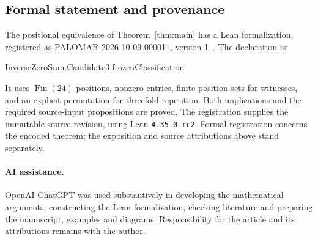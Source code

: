 \documentclass[11pt]{article}
\theoremstyle{definition}
\theoremstyle{remark}
\begin{document}
\subsection{Formal statement and provenance}
The positional equivalence of Theorem~\ref{thm:main} has a Lean
formalization, registered as
\href{https://palomar-registry.org/entry.html?id=PALOMAR-2026-10-09-000011&version=1}{PALOMAR-2026-10-09-000011, version 1}~\cite{Palomar2026}.
The declaration is:
\begin{center}\small\ttfamily
InverseZeroSum.Candidate3.frozenClassification
\end{center}
It uses $\operatorname{Fin}(24)$ positions, nonzero entries, finite position
sets for witnesses, and an explicit permutation for threefold repetition.
Both implications and the required source-input propositions are proved.
The registration supplies the immutable source revision, using Lean
\texttt{4.35.0-rc2}. Formal registration concerns the encoded theorem;
the exposition and source attributions above stand separately.

\paragraph{AI assistance.}
OpenAI ChatGPT was used substantively in developing the mathematical
arguments, constructing the Lean formalization, checking literature and
preparing the manuscript, examples and diagrams. Responsibility for the
article and its attributions remains with the author.

\begingroup
\small


\endgroup
\end{document}
